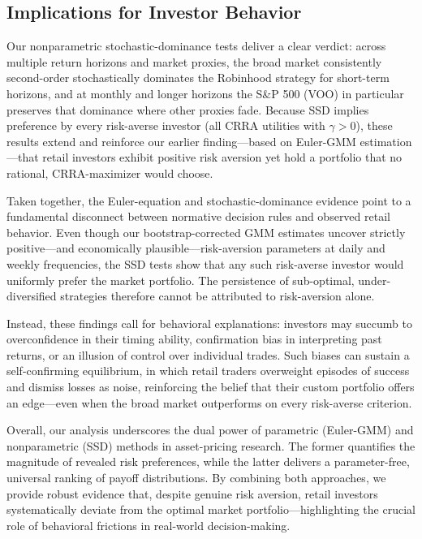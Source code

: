 \subsection{Implications for Investor Behavior}

Our nonparametric stochastic-dominance tests deliver a clear verdict: across multiple return horizons and market proxies, the broad market consistently second-order stochastically dominates the Robinhood strategy for short-term horizons, and at monthly and longer horizons the S\&P 500 (VOO) in particular preserves that dominance where other proxies fade.  
Because SSD implies preference by every risk-averse investor (all CRRA utilities with $\gamma>0$), these results extend and reinforce our earlier finding—based on Euler-GMM estimation—that retail investors exhibit positive risk aversion yet hold a portfolio that no rational, CRRA-maximizer would choose.  

Taken together, the Euler-equation and stochastic-dominance evidence point to a fundamental disconnect between normative decision rules and observed retail behavior.  
Even though our bootstrap-corrected GMM estimates uncover strictly positive—and economically plausible—risk-aversion parameters at daily and weekly frequencies, 
the SSD tests show that any such risk-averse investor would uniformly prefer the market portfolio.  
The persistence of sub-optimal, under-diversified strategies therefore cannot be attributed to risk-aversion alone.

Instead, these findings call for behavioral explanations: investors may succumb to overconfidence in their timing ability, confirmation bias in interpreting past returns, or an illusion of control over individual trades.  
Such biases can sustain a self-confirming equilibrium, in which retail traders overweight episodes of success and dismiss losses as noise, reinforcing the belief that their custom portfolio offers an edge—even when the broad market outperforms on every risk-averse criterion.

Overall, our analysis underscores the dual power of parametric (Euler-GMM) and nonparametric (SSD) methods in asset-pricing research.  
The former quantifies the magnitude of revealed risk preferences, while the latter delivers a parameter-free, universal ranking of payoff distributions.  
By combining both approaches, we provide robust evidence that, despite genuine risk aversion, retail investors systematically deviate from the optimal market portfolio—highlighting the crucial role of behavioral frictions in real-world decision-making.  

